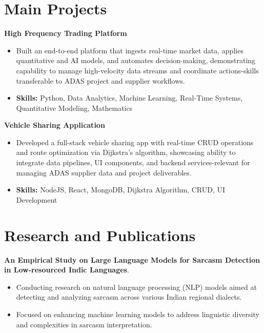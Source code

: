 \documentclass[a4paper,11pt]{article}
\begin{document}
\section{\textbf{Main Projects}}

\vspace{1mm}
  \textbf{High Frequency Trading Platform  }
\vspace{-1.5mm} %
\begin{itemize}
  \item Built an end-to-end platform that ingests real-time market data, applies quantitative and AI models, and automates decision-making, demonstrating capability to manage high-velocity data streams and coordinate actions-skills transferable to ADAS project and supplier workflows.
\vspace{-3mm}
  \item \textbf{Skills:} Python, Data Analytics, Machine Learning, Real-Time Systems, Quantitative Modeling, Mathematics
\end{itemize}


\vspace{1mm}
   \textbf{Vehicle Sharing Application }
\vspace{-1.5mm} %
\begin{itemize}
  \item Developed a full-stack vehicle sharing app with real-time CRUD operations and route optimization via Dijkstra's algorithm, showcasing ability to integrate data pipelines, UI components, and backend services-relevant for managing ADAS supplier data and project deliverables.
\vspace{-3mm}
  \item \textbf{Skills:} NodeJS, React, MongoDB, Dijkstra Algorithm, CRUD, UI Development
\end{itemize}



\section{\textbf{Research and Publications} \hfill }
\vspace{1mm}
  \textbf{An Empirical Study on Large Language Models for Sarcasm Detection in Low-resourced Indic Languages}.
\vspace{-1mm} %
\begin{itemize}
  \item Conducting research on natural language processing (NLP) models aimed at detecting and analyzing sarcasm across various Indian regional dialects.
\vspace{-3mm}
  \item Focused on enhancing machine learning models to address linguistic diversity and complexities in sarcasm interpretation.
\end{itemize}
\end{document}

